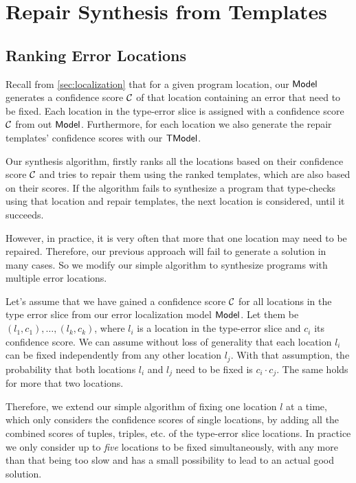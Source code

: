 \section{Repair Synthesis from Templates}
\label{sec:synthesis}

\subsection{Ranking Error Locations}
\label{subsec:location-rank}

Recall from \autoref{sec:localization} that for a given program location, our
$\mathsf{Model}$ generates a confidence score $\mathcal{C}$ of that location containing an
error that need to be fixed. Each location in the type-error slice is assigned
with a confidence score $\mathcal{C}$ from out $\mathsf{Model}$. Furthermore, for each
location we also generate the repair templates' confidence scores with our
$\mathsf{TModel}$.

Our synthesis algorithm, firstly ranks all the locations based on their
confidence score $\mathcal{C}$ and tries to repair them using the ranked templates,
which are also based on their scores. If the algorithm fails to synthesize a
program that type-checks using that location and repair templates, the next
location is considered, until it succeeds.

However, in practice, it is very often that more that one location may need to
be repaired. Therefore, our previous approach will fail to generate a solution
in many cases. So we modify our simple algorithm to synthesize programs with
multiple error locations.

Let's assume that we have gained a confidence score $\mathcal{C}$ for all locations
in the type error slice from our error localization model $\mathsf{Model}$. Let them be
$(l_1, c_1), \dots, (l_k, c_k)$, where $l_i$ is a location in the type-error
slice and $c_i$ its confidence score. We can assume without loss of generality
that each location $l_i$ can be fixed independently from any other location
$l_j$. With that assumption, the probability that both locations $l_i$ and $l_j$
need to be fixed is $c_i \cdot c_j$. The same holds for more that two locations.

Therefore, we extend our simple algorithm of fixing one location $l$ at a time,
which only considers the confidence scores of single locations, by adding all
the combined scores of tuples, triples, etc. of the type-error slice locations.
In practice we only consider up to \emph{five} locations to be fixed
simultaneously, with any more than that being too slow and has a small
possibility to lead to an actual good solution.


